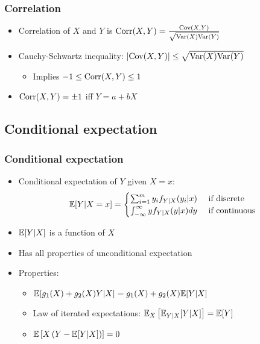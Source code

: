 \begin{frame}
  \frametitle{Correlation}
  \begin{itemize}
  \item \alert{Correlation} of $X$ and $Y$ is
    $\mathrm{Corr}(X,Y) = \frac{\mathrm{Cov}(X,Y)}{\sqrt{\mathrm{Var}(X) \mathrm{Var}(Y)}}$
  \item \alert{Cauchy-Schwartz inequality}: $\left\vert {\mathrm{Cov}(X,Y)} \right\vert \leq
    \sqrt{\mathrm{Var}(X) \mathrm{Var}(Y)}$
    \begin{itemize}
    \item Implies $-1 \leq \mathrm{Corr}(X,Y) \leq 1$
    \end{itemize}
  \item $\mathrm{Corr}(X,Y) = \pm 1$ iff $Y = a + b X$ 
  \end{itemize}
\end{frame}

\subsection{Conditional expectation}

\begin{frame} \frametitle{Conditional expectation}
  \begin{itemize}
  \item \alert{Conditional expectation} of $Y$ given $X=x$:
    \[ \mathbb{E}[Y | X = x ] = \begin{cases} \sum_{i=1}^m y_i f_{Y|X}(y_i|x) & \text{ if
        discrete}  \\
      \int_{-\infty}^\infty y f_{Y|X}(y|x) dy & \text{ if 
        continuous}
    \end{cases}
    \]
  \item $\mathbb{E}[Y | X]$ is a function of $X$
  \item Has all properties of unconditional expectation
  \item Properties:
    \begin{itemize}
    \item $\mathbb{E}[ g_1(X) + g_2(X) Y | X] = g_1(X) + g_2(X) \mathbb{E}[Y | X]$
    \item \alert{Law of iterated expectations}: $\mathbb{E}_X \left[
        \mathbb{E}_{Y|X}[Y|X] \right] = \mathbb{E}[Y]$
    \item $\mathbb{E}\left[X \left(Y - \mathbb{E}[Y|X] \right) \right] = 0$
    \end{itemize}
  \end{itemize}
\end{frame}

